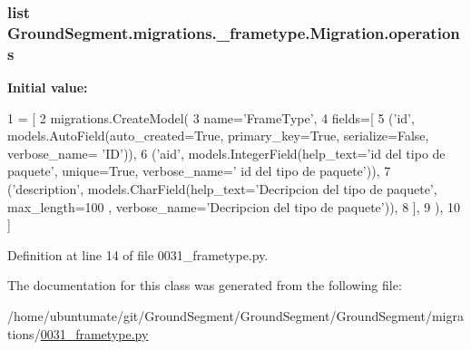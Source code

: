 \hypertarget{class_ground_segment_1_1migrations_1_10031__frametype_1_1_migration_a0694f6b55ca56bb566dcbb44df426a7d}{}
\subsubsection[{operations}]{\setlength{\rightskip}{0pt plus 5cm}list Ground\+Segment.\+migrations.\+\_\+frametype.\+Migration.\+operations\hspace{0.3cm}{\ttfamily [static]}}\label{class_ground_segment_1_1migrations_1_10031__frametype_1_1_migration_a0694f6b55ca56bb566dcbb44df426a7d}
{\bfseries Initial value\+:}
\begin{DoxyCode}
1 = [
2         migrations.CreateModel(
3             name=\textcolor{stringliteral}{'FrameType'},
4             fields=[
5                 (\textcolor{stringliteral}{'id'}, models.AutoField(auto\_created=\textcolor{keyword}{True}, primary\_key=\textcolor{keyword}{True}, serialize=\textcolor{keyword}{False}, verbose\_name=\textcolor{stringliteral}{
      'ID'})),
6                 (\textcolor{stringliteral}{'aid'}, models.IntegerField(help\_text=\textcolor{stringliteral}{'id del tipo de paquete'}, unique=\textcolor{keyword}{True}, verbose\_name=\textcolor{stringliteral}{'
      id del tipo de paquete'})),
7                 (\textcolor{stringliteral}{'description'}, models.CharField(help\_text=\textcolor{stringliteral}{'Decripcion del tipo de paquete'}, max\_length=100
      , verbose\_name=\textcolor{stringliteral}{'Decripcion del tipo de paquete'})),
8             ],
9         ),
10     ]
\end{DoxyCode}


Definition at line 14 of file 0031\+\_\+frametype.\+py.



The documentation for this class was generated from the following file\+:\begin{DoxyCompactItemize}
\item 
/home/ubuntumate/git/\+Ground\+Segment/\+Ground\+Segment/\+Ground\+Segment/migrations/\hyperlink{0031__frametype_8py}{0031\+\_\+frametype.\+py}\end{DoxyCompactItemize}

